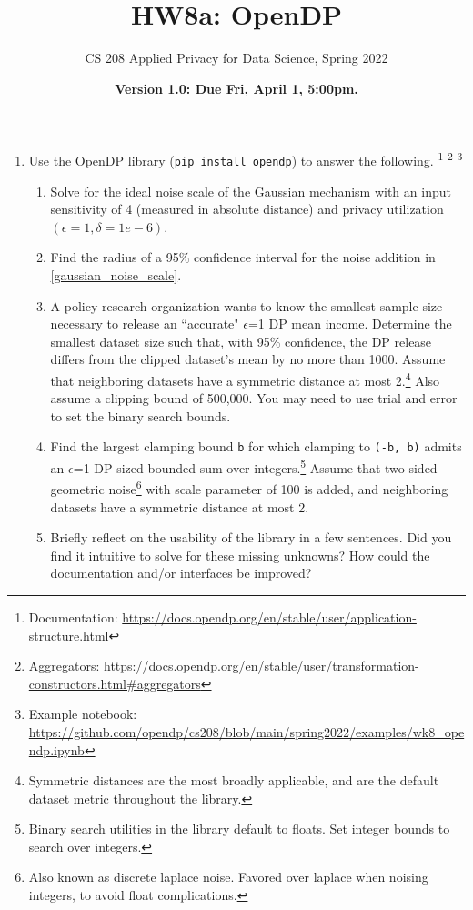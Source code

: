 \documentclass[11pt]{article}
\title{\vspace{-1.5cm} HW8a: OpenDP}
\author{CS 208 Applied Privacy for Data Science, Spring 2022}
\date{\textbf{Version 1.0: Due Fri, April 1, 5:00pm.}}
\begin{document}
\maketitle

\begin{enumerate}
\item Use the OpenDP library (\texttt{pip install opendp}) to answer the following.
\footnote{Documentation: \url{https://docs.opendp.org/en/stable/user/application-structure.html}}
\footnote{Aggregators: \url{https://docs.opendp.org/en/stable/user/transformation-constructors.html\#aggregators}} 
\footnote{Example notebook: \url{https://github.com/opendp/cs208/blob/main/spring2022/examples/wk8\_opendp.ipynb}}
\begin{enumerate}
\item Solve for the ideal noise scale of the Gaussian mechanism with an input sensitivity of 4 (measured in absolute distance) and privacy utilization $(\epsilon=1, \delta=1e-6)$.
\label{gaussian_noise_scale}
\item Find the radius of a 95\% confidence interval for the noise addition in \ref{gaussian_noise_scale}.
\item A policy research organization wants to know the smallest sample size necessary to release an ``accurate" $\epsilon$=1 DP mean income. Determine the smallest dataset size such that, with 95\% confidence, the DP release differs from the clipped dataset's mean by no more than 1000. Assume that neighboring datasets have a symmetric distance at most 2.\footnote{Symmetric distances are the most broadly applicable, and are the default dataset metric throughout the library.} Also assume a clipping bound of 500,000. You may need to use trial and error to set the binary search bounds.
\item Find the largest clamping bound \texttt{b} for which clamping to \texttt{(-b, b)} admits an $\epsilon$=1 DP sized bounded sum over integers.\footnote{Binary search utilities in the library default to floats. Set integer bounds to search over integers.} Assume that two-sided geometric noise\footnote{Also known as discrete laplace noise. Favored over laplace when noising integers, to avoid float complications.} with scale parameter of 100 is added, and neighboring datasets have a symmetric distance at most 2.
\item Briefly reflect on the usability of the library in a few sentences. Did you find it intuitive to solve for these missing unknowns? How could the documentation and/or interfaces be improved?
\end{enumerate}


\end{enumerate}
\end{document}

